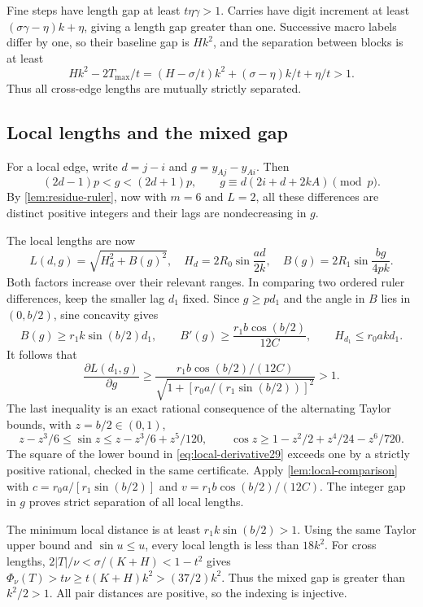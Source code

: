 Fine steps have length gap at least $t\eta\gamma>1$. Carries have digit
increment at least $(\sigma\gamma-\eta)k+\eta$, giving a length gap
greater than one. Successive macro labels differ by one, so their
baseline gap is $Hk^2$, and the separation between blocks is at least
\[
 Hk^2-2T_{\max}/t
 =(H-\sigma/t)k^2+(\sigma-\eta)k/t+\eta/t>1.
\]
Thus all cross-edge lengths are mutually strictly separated.

\subsection{Local lengths and the mixed gap}

For a local edge, write $d=j-i$ and $g=y_{Aj}-y_{Ai}$. Then
\[
 (2d-1)p<g<(2d+1)p,\qquad g\equiv d(2i+d+2kA)\pmod p.
\]
By \cref{lem:residue-ruler}, now with $m=6$ and $L=2$, all these
differences are distinct positive integers and their lags are nondecreasing
in $g$.

The local lengths are now
\[
 L(d,g)=\sqrt{H_d^2+B(g)^2},\quad
 H_d=2R_0\sin\frac{ad}{2k},\quad B(g)=2R_1\sin\frac{bg}{4pk}.
\]
Both factors increase over their relevant ranges. In comparing two
ordered ruler differences, keep the smaller lag $d_1$ fixed. Since
$g\ge pd_1$ and the angle in $B$ lies in $(0,b/2)$, sine concavity gives
\[
 B(g)\ge r_1k\sin(b/2)d_1,\qquad
 B'(g)\ge\frac{r_1b\cos(b/2)}{12C},\qquad
 H_{d_1}\le r_0akd_1.
\]
It follows that
\begin{equation}\label{eq:local-derivative29}
 \frac{\partial L(d_1,g)}{\partial g}\ge
 \frac{r_1b\cos(b/2)/(12C)}
 {\sqrt{1+[r_0a/(r_1\sin(b/2))]^2}}>1.
\end{equation}
The last inequality is an exact rational consequence of the alternating
Taylor bounds, with $z=b/2\in(0,1)$,
\[
 z-z^3/6\le\sin z\le z-z^3/6+z^5/120,\qquad
 \cos z\ge1-z^2/2+z^4/24-z^6/720.
\]
The square of the lower bound in \eqref{eq:local-derivative29} exceeds
one by a strictly positive rational, checked in the same certificate.
Apply \cref{lem:local-comparison} with
$c=r_0a/[r_1\sin(b/2)]$ and $v=r_1b\cos(b/2)/(12C)$.
The integer gap in $g$ proves strict separation of all local lengths.

The minimum local distance is at least $r_1k\sin(b/2)>1$. Using the same
Taylor upper bound and $\sin u\le u$, every local length is less than
$18k^2$. For cross lengths, $2|T|/\nu<\sigma/(K+H)<1-t^2$ gives
$\Phi_\nu(T)>t\nu\ge t(K+H)k^2>(37/2)k^2$.
Thus the mixed gap is greater than $k^2/2>1$.
All pair distances are positive, so the indexing is injective.

